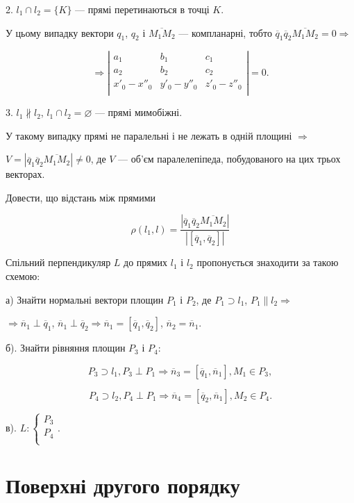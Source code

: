 2. $l_1 \cap l_2 = \{K\}$ --- прямі перетинаються в точці $K$.


У цьому випадку вектори $q_1$, $q_2$ і
$\overline{M_1M_2}$ --- компланарні,
тобто $\overline{q}_1 \overline{q}_2 \overline{M_1M_2} = 0 \Rightarrow$

$$\Rightarrow \left| \begin{matrix}
	a_1 & b_1 & c_1 \\
	a_2 & b_2 & c_2 \\
	x'_0 - x''_0 & y'_0 - y''_0 & z'_0 - z''_0 \\
\end{matrix} \right| = 0.$$



3. $l_1 \nparallel l_2$, $l_1 \cap l_2 = \varnothing$ --- прямі мимобіжні.


У такому випадку прямі не
паралельні і не лежать в одній
площині $\Rightarrow$

$V = |\overline{q}_1 \overline{q}_2 \overline{M_1M_2}| \neq 0$, де $V$ --- об’єм
паралелепіпеда, побудованого на цих
трьох векторах.

Довести, що відстань між прямими

$$\rho(l_1,l) = \dfrac{|\overline{q}_1 \overline{q}_2 \overline{M_1M_2}|}{|[\overline{q}_1,\overline{q}_2]|}$$


Спільний перпендикуляр $L$ до прямих $l_1$ і $l_2$ пропонується знаходити за
такою схемою:

а) Знайти нормальні вектори площин $P_1$ і $P_2$, де $P_1 \supset l_1$, $P_1 \parallel l_2 \Rightarrow$

$\Rightarrow \overline{n}_1 \perp \overline{q}_1$, $\overline{n}_1 \perp \overline{q}_2 \Rightarrow \overline{n}_1 = [\overline{q}_1,\overline{q}_2]$, $\overline{n}_2 = \overline{n}_1$.

б). Знайти рівняння площин $P_3$ і $P_4$:

$$P_3 \supset l_1, P_3 \perp P_1 \Rightarrow \overline{n}_3 = [\overline{q}_1,\overline{n}_1], M_1 \in P_3,$$

$$P_4 \supset l_2, P_4 \perp P_1 \Rightarrow \overline{n}_4 = [\overline{q}_2,\overline{n}_1], M_2 \in P_4.$$


в). $L: \left\{ \begin{matrix}
	P_3 \\
	P_4 \\
\end{matrix} \right. .$


\section{Поверхні другого порядку}

